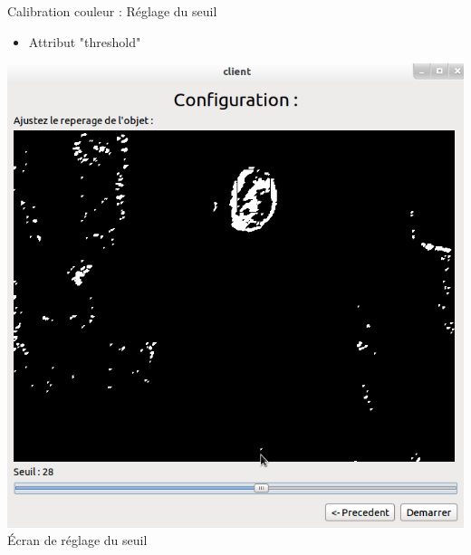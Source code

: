 \documentclass{beamer}
\begin{document}
            \begin{frame}{Calibration couleur : Réglage du seuil}
                  \begin{itemize}
                        \item{Attribut "threshold"}
                  \end{itemize}
                  \begin{center}
                        \includegraphics[scale=0.25]{Capture2.png}\\
                        Écran de réglage du seuil
                  \end{center}
            \end{frame}
\end{document}
